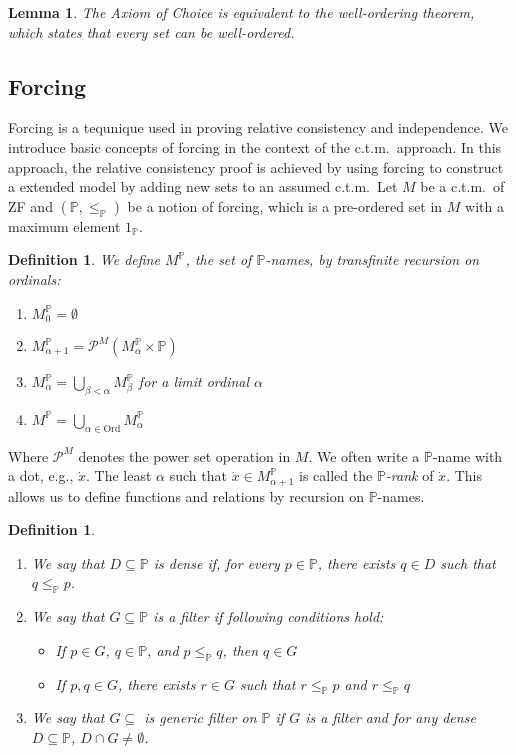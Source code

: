 \documentclass{report}
\newtheorem{lem}[thm]{Lemma}
\newtheorem{dfn}[thm]{Definition}
\begin{document}
\begin{lem}
  The Axiom of Choice is equivalent to the well-ordering theorem, which states that every set can be well-ordered.
\end{lem}


\subsection{Forcing}
Forcing is a tequnique used in proving relative consistency and independence.
We introduce basic concepts of forcing in the context of the c.t.m.\  approach.
In this approach, the relative consistency proof is achieved by using forcing to construct a extended model by adding new sets to an assumed c.t.m.\ 
Let $M$ be a c.t.m.\  of ZF and $(\mathbb{P}, \leq_{\mathbb{P}})$ be a notion of forcing, which is a pre-ordered set in $M$ with a maximum element $1_{\mathbb{P}}$.

\begin{dfn}
  We define $M^{\mathbb{P}}$, the set of \emph{$\mathbb{P}$-names}, by transfinite recursion on ordinals:
  \begin{enumerate}
    \item $M^{\mathbb{P}}_0 = \emptyset$
    \item $M^{\mathbb{P}}_{\alpha + 1} = \mathcal{P}^M(M^{\mathbb{P}}_{\alpha} \times \mathbb{P})$
    \item $M^{\mathbb{P}}_{\alpha} = \bigcup_{\beta < \alpha} M^{\mathbb{P}}_{\beta}$ for a limit ordinal $\alpha$
    \item $M^{\mathbb{P}} = \bigcup_{\alpha \in \mathrm{Ord}} M^{\mathbb{P}}_{\alpha}$
  \end{enumerate}
\end{dfn}
Where $\mathcal{P}^M$ denotes the power set operation in $M$. 
We often write a $\mathbb{P}$-name with a dot, e.g., $\dot{x}$.
The least $\alpha$ such that $\dot{x} \in M^{\mathbb{P}}_{\alpha + 1}$ is called the \emph{$\mathbb{P}$-rank} of $\dot{x}$.
This allows us to define functions and relations by recursion on $\mathbb{P}$-names.

\begin{dfn}  
  \,
  \begin{enumerate}
    \item We say that $D \subseteq \mathbb{P}$ is \emph{dense} if, for every $p \in \mathbb{P}$, there exists $q \in D$ such that $q \leq_{\mathbb{P}} p$.
    \item We say that $G \subseteq \mathbb{P}$ is a \emph{filter} if following conditions hold:
      \begin{itemize}
        \item If $p \in G$, $q \in \mathbb{P}$, and $p \leq_{\mathbb{P}} q$, then $q \in G$
        \item If $p, q \in G$, there exists $r \in G$ such that $r \leq_{\mathbb{P}} p$ and $r \leq_{\mathbb{P}} q$
      \end{itemize}
    \item We say that $G \subseteq$ is \emph{generic filter} on $\mathbb{P}$ if $G$ is a filter and for any dense $D \subseteq \mathbb{P}$, $D \cap G \neq \emptyset$.
  \end{enumerate}
\end{dfn}
\end{document}
